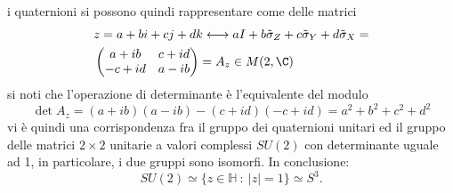 \documentclass[10pt, letterpaper]{report}
\begin{document}
i quaternioni si possono quindi rappresentare come delle matrici\begin{align}
    & z=a+bi+cj+dk\longleftrightarrow aI+b\tilde\sigma_Z+c\tilde\sigma_Y+d\tilde\sigma_X=\\ &\begin{pmatrix}
        a+ib&c+id\\ -c+id&a-ib
    \end{pmatrix} =A_z\in M(2,\C)
\end{align}
si noti che l'operazione di determinante è l'equivalente del modulo\begin{equation}
    \det A_z=(a+ib)(a-ib)-(c+id)(-c+id)=a^2+b^2+c^2+d^2
\end{equation}
vi è quindi una corrispondenza fra il gruppo dei quaternioni unitari ed il gruppo delle matrici $2\times 2$ unitarie a valori complessi $SU(2)$ con determinante uguale ad 1, in particolare, i due gruppi sono isomorfi. In conclusione: \begin{equation}
    SU(2)\simeq \{z\in\mathbb H \ : \ |z|=1\}\simeq S^3.
\end{equation}
\end{document}
